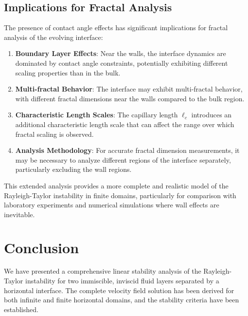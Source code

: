 \documentclass[12pt,a4paper]{article}
\begin{document}
\subsection{Implications for Fractal Analysis}
The presence of contact angle effects has significant implications for fractal analysis of the evolving interface:

\begin{enumerate}
    \item \textbf{Boundary Layer Effects}: Near the walls, the interface dynamics are dominated by contact angle constraints, potentially exhibiting different scaling properties than in the bulk.
    
    \item \textbf{Multi-fractal Behavior}: The interface may exhibit multi-fractal behavior, with different fractal dimensions near the walls compared to the bulk region.
    
    \item \textbf{Characteristic Length Scales}: The capillary length $\ell_c$ introduces an additional characteristic length scale that can affect the range over which fractal scaling is observed.
    
    \item \textbf{Analysis Methodology}: For accurate fractal dimension measurements, it may be necessary to analyze different regions of the interface separately, particularly excluding the wall regions.
\end{enumerate}

This extended analysis provides a more complete and realistic model of the Rayleigh-Taylor instability in finite domains, particularly for comparison with laboratory experiments and numerical simulations where wall effects are inevitable.

\section{Conclusion}
We have presented a comprehensive linear stability analysis of the Rayleigh-Taylor instability for two immiscible, inviscid fluid layers separated by a horizontal interface. The complete velocity field solution has been derived for both infinite and finite horizontal domains, and the stability criteria have been established.
\end{document}
